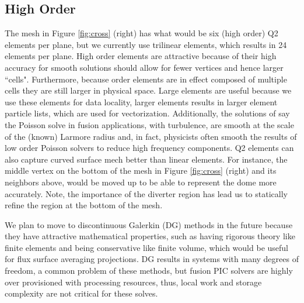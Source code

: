 \documentclass[review]{siamart}
\begin{document}
\subsection{High Order}
\label{sec:ho}

The mesh in Figure \ref{fig:cross} (right) has what would be six (high order) Q2 elements per plane, but we currently use trilinear elements, which results in 24 elements per plane.
High order elements are attractive because of their high accuracy for smooth solutions should allow for fewer vertices and hence larger ``cells".
Furthermore, because order elements are in effect composed of multiple cells they are still larger in physical space.
Large elements are useful because we use these elements for data locality, larger elements results in larger element particle lists, which are used for vectorization.
Additionally, the solutions of say the Poisson solve in fusion applications, with turbulence, are smooth at the scale of the (known) Larmore radius and, in fact, physicists often smooth the results of low order Poisson solvers to reduce high frequency components.
Q2 elements can also capture curved surface mech better than linear elements.
For instance, the middle vertex on the bottom of the mesh in Figure \ref{fig:cross} (right) and its neighbors above, would be moved up to be able to represent the dome more accurately.
Note, the importance of the diverter region has lead us to statically refine the region at the bottom of the mesh.

We plan to move to discontinuous Galerkin (DG) methods in the future because they have attractive mathematical properties, such as having rigorous theory like finite elements and being conservative like finite volume, which would be useful for flux surface averaging projections.
DG results in systems with many degrees of freedom, a common problem of these methods, but fusion PIC solvers are highly over provisioned with processing resources, thus, local work and storage complexity are not critical for these solves.




 
\end{document}
